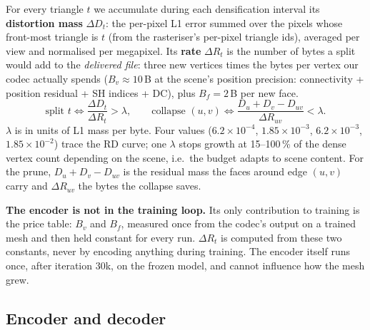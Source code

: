 \documentclass[11pt,a4paper]{article}
\begin{document}
For every triangle $t$ we accumulate during each densification interval its \textbf{distortion mass} $\Delta D_t$: the per-pixel L1 error summed over the pixels whose front-most triangle is $t$ (from the rasteriser's per-pixel triangle ids), averaged per view and normalised per megapixel. Its \textbf{rate} $\Delta R_t$ is the number of bytes a split would add to the \emph{delivered file}: three new vertices times the bytes per vertex our codec actually spends ($B_v \approx 10$\,B at the scene's position precision: connectivity + position residual + SH indices + DC), plus $B_f = 2$\,B per new face.
\begin{equation}
\text{split } t \iff \frac{\Delta D_t}{\Delta R_t} > \lambda,
\qquad
\text{collapse } (u,v) \iff \frac{D_u + D_v - D_{uv}}{\Delta R_{uv}} < \lambda .
\label{eq:rule}
\end{equation}
$\lambda$ is in units of L1 mass per byte. Four values ($6.2\times10^{-4}$, $1.85\times10^{-3}$, $6.2\times10^{-3}$, $1.85\times10^{-2}$) trace the RD curve; one $\lambda$ stops growth at 15--100\,\% of the dense vertex count depending on the scene, i.e.\ the budget adapts to scene content. For the prune, $D_u + D_v - D_{uv}$ is the residual mass the faces around edge $(u,v)$ carry and $\Delta R_{uv}$ the bytes the collapse saves.

\textbf{The encoder is not in the training loop.} Its only contribution to training is the price table: $B_v$ and $B_f$, measured once from the codec's output on a trained mesh and then held constant for every run. $\Delta R_t$ is computed from these two constants, never by encoding anything during training. The encoder itself runs once, after iteration 30k, on the frozen model, and cannot influence how the mesh grew.

\subsection{Encoder and decoder}
\end{document}
